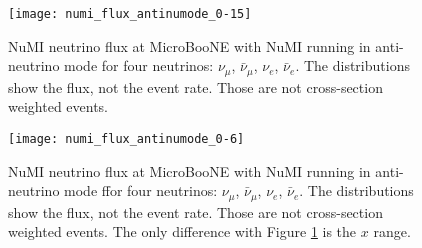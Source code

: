 \documentclass[a4paper, oneside, 12pt]{article}
\newcommand{\uB}{MicroBooNE\xspace}
\begin{document}
\begin{figure}[]
\centering
\texttt{[image: numi\_flux\_antinumode\_0-15]}
\caption{NuMI neutrino flux at \uB with NuMI running in anti-neutrino mode for four neutrinos: $\nu_\mu$, $\bar{\nu}_\mu$, $\nu_e$, $\bar{\nu}_e$. The distributions show the flux, not the event rate. Those are not cross-section weighted events.}
\label{fig:numi_flux_a}
\end{figure}

\begin{figure}[]
\centering
\texttt{[image: numi\_flux\_antinumode\_0-6]}
\caption{NuMI neutrino flux at \uB with NuMI running in anti-neutrino mode ffor four neutrinos: $\nu_\mu$, $\bar{\nu}_\mu$, $\nu_e$, $\bar{\nu}_e$. The distributions show the flux, not the event rate. Those are not cross-section weighted events. The only difference with Figure \ref{fig:numi_flux_a} is the $x$ range. }
\label{fig:numi_flux_a2}
\end{figure}
\end{document}
